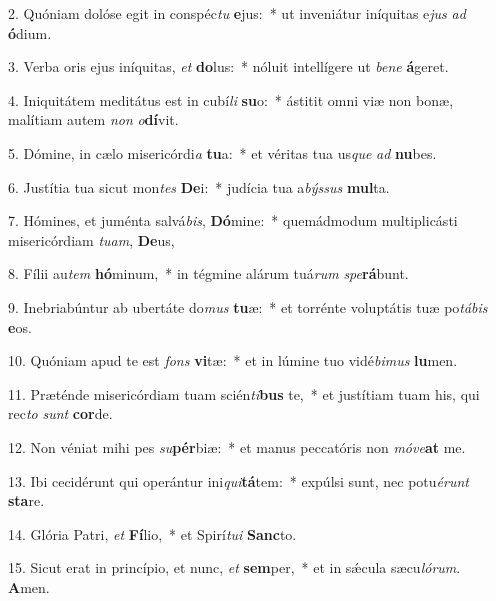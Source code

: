 2. Quóniam dolóse egit in conspéc\textit{tu} \textbf{e}jus:~*  ut inveniátur iníquitas e\textit{jus} \textit{ad} \textbf{ó}dium.\

3. Verba oris ejus iníquitas, \textit{et} \textbf{do}lus:~*  nóluit intellígere ut \textit{be}\textit{ne} \textbf{á}geret.\

4. Iniquitátem meditátus est in cubí\textit{li} \textbf{su}o:~*  ástitit omni viæ non bonæ, malítiam autem \textit{non} \textit{o}\textbf{dí}vit.\

5. Dómine, in cælo misericórdi\textit{a} \textbf{tu}a:~*  et véritas tua us\textit{que} \textit{ad} \textbf{nu}bes.\

6. Justítia tua sicut mon\textit{tes} \textbf{De}i:~*  judícia tua a\textit{býs}\textit{sus} \textbf{mul}ta.\

7. Hómines, et juménta salvá\textit{bis}, \textbf{Dó}mine:~*  quemádmodum multiplicásti misericórdiam \textit{tu}\textit{am}, \textbf{De}us,\

8. Fílii au\textit{tem} \textbf{hó}minum,~*  in tégmine alárum tuá\textit{rum} \textit{spe}\textbf{rá}bunt.\

9. Inebriabúntur ab ubertáte do\textit{mus} \textbf{tu}æ:~*  et torrénte voluptátis tuæ po\textit{tá}\textit{bis} \textbf{e}os.\

10. Quóniam apud te est \textit{fons} \textbf{vi}tæ:~*  et in lúmine tuo vidé\textit{bi}\textit{mus} \textbf{lu}men.\

11. Præténde misericórdiam tuam scién\textit{ti}\textbf{bus} te,~*  et justítiam tuam his, qui rec\textit{to} \textit{sunt} \textbf{cor}de.\

12. Non véniat mihi pes \textit{su}\textbf{pér}biæ:~*  et manus peccatóris non \textit{mó}\textit{ve}\textbf{at} me.\

13. Ibi cecidérunt qui operántur ini\textit{qui}\textbf{tá}tem:~*  expúlsi sunt, nec potu\textit{é}\textit{runt} \textbf{sta}re.\

14. Glória Patri, \textit{et} \textbf{Fí}lio,~*  et Spirí\textit{tu}\textit{i} \textbf{Sanc}to.\

15. Sicut erat in princípio, et nunc, \textit{et} \textbf{sem}per,~*  et in sǽcula sæcu\textit{ló}\textit{rum}. \textbf{A}men.\

